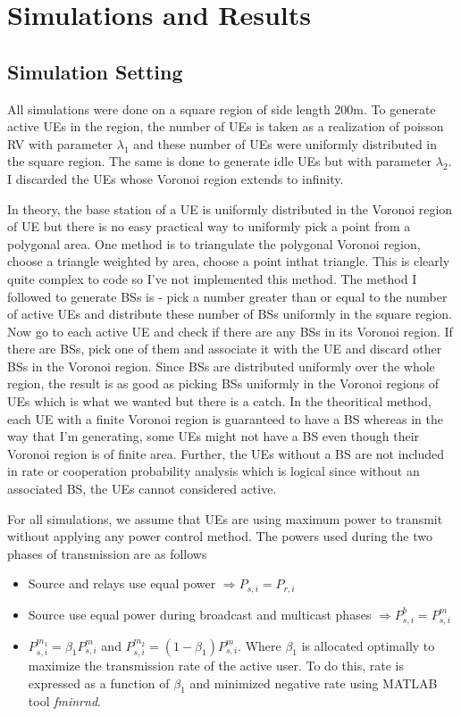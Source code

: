 \section{Simulations and Results}

\subsection{Simulation Setting}

All simulations were done on a square region of side length 200m. 
To generate active UEs in the region, the number of UEs is taken as a realization of poisson RV with parameter $\lambda_1$ and these number of UEs were uniformly distributed in the square region. The same is done to generate idle UEs but with parameter $\lambda_2$. I discarded the UEs whose Voronoi region extends to infinity. 
\par In theory, the base station of a UE is uniformly distributed in the Voronoi region of UE but there is no easy practical way to uniformly pick a point from a polygonal area. One method is to triangulate the polygonal Voronoi region, choose a triangle weighted by area, choose a point inthat triangle. This is clearly quite complex to code so I've not implemented this method. The method I followed to generate BSs is - pick a number greater than or equal to the number of active UEs and distribute these number of BSs uniformly in the square region. Now go to each active UE and check if there are any BSs in its Voronoi region. If there are BSs, pick one of them and associate it with the UE and discard other BSs in the Voronoi region. Since BSs are distributed uniformly over the whole region, the result is as good as picking BSs uniformly in the Voronoi regions of UEs which is what we wanted but there is a catch. In the theoritical method, each UE with a finite Voronoi region is guaranteed to have a BS whereas in the way that I'm generating, some UEs might not have a BS even though their Voronoi region is of finite area. Further, the UEs without a BS are not included in rate or cooperation probability analysis which is logical since without an associated BS, the UEs cannot considered active.
\par For all simulations, we assume that UEs are using maximum power to transmit without applying any power control method.\label{sec:powerCon}  The powers used during the two phases of transmission are as follows
\begin{itemize}
\item Source and relays use equal power $\Rightarrow P_{s,i} = P_{r,i} $ 
\item Source use equal power during broadcast and multicast phases $\Rightarrow P_{s,i}^b = P_{s,i}^m$ 
\item $P_{s,i}^{m_1} = \beta_1 P_{s,i}^m$ and $P_{s,i}^{m_2} = (1-\beta_1) P_{s,i}^m$. Where $\beta_1$ is allocated optimally to maximize the transmission rate of the active user. To do this, rate is expressed as a function of $\beta_1$ and minimized negative rate using MATLAB tool \textit{fminrnd}.
\end{itemize}
